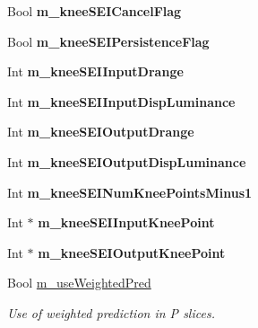 \begin{DoxyCompactItemize}
\mbox{\label{class_t_app_enc_cfg_a40f2869d68e57080ca38c508a607ac86}} 
Bool {\bfseries m\+\_\+knee\+S\+E\+I\+Cancel\+Flag}
\item 
\mbox{\label{class_t_app_enc_cfg_a4bf0332f0211161345046ba966867ac3}} 
Bool {\bfseries m\+\_\+knee\+S\+E\+I\+Persistence\+Flag}
\item 
\mbox{\label{class_t_app_enc_cfg_a3e7142c9f8bd2f3b079f0dc344a8718b}} 
Int {\bfseries m\+\_\+knee\+S\+E\+I\+Input\+Drange}
\item 
\mbox{\label{class_t_app_enc_cfg_a4743ad4e757052c5620cc04795a3dd31}} 
Int {\bfseries m\+\_\+knee\+S\+E\+I\+Input\+Disp\+Luminance}
\item 
\mbox{\label{class_t_app_enc_cfg_a1e25fcaaac846c02fc12da04a1d187ff}} 
Int {\bfseries m\+\_\+knee\+S\+E\+I\+Output\+Drange}
\item 
\mbox{\label{class_t_app_enc_cfg_a0257e1051b8bfe799c075be8bdff0c2e}} 
Int {\bfseries m\+\_\+knee\+S\+E\+I\+Output\+Disp\+Luminance}
\item 
\mbox{\label{class_t_app_enc_cfg_ab84fccc4c60e67afc1a42b5bdb5c4c30}} 
Int {\bfseries m\+\_\+knee\+S\+E\+I\+Num\+Knee\+Points\+Minus1}
\item 
\mbox{\label{class_t_app_enc_cfg_ac35294b9690a1ad23b15142f5ba46f2c}} 
Int $\ast$ {\bfseries m\+\_\+knee\+S\+E\+I\+Input\+Knee\+Point}
\item 
\mbox{\label{class_t_app_enc_cfg_a5b029778f62cd2e35547539d8e5d2e68}} 
Int $\ast$ {\bfseries m\+\_\+knee\+S\+E\+I\+Output\+Knee\+Point}
\item 
\mbox{\label{class_t_app_enc_cfg_acc23508c66c482cc9d119ea7a54c5365}} 
Bool \hyperlink{class_t_app_enc_cfg_acc23508c66c482cc9d119ea7a54c5365}{m\+\_\+use\+Weighted\+Pred}
\begin{DoxyCompactList}\small\item\em Use of weighted prediction in P slices. \end{DoxyCompactList}\item 

\end{DoxyCompactItemize}
